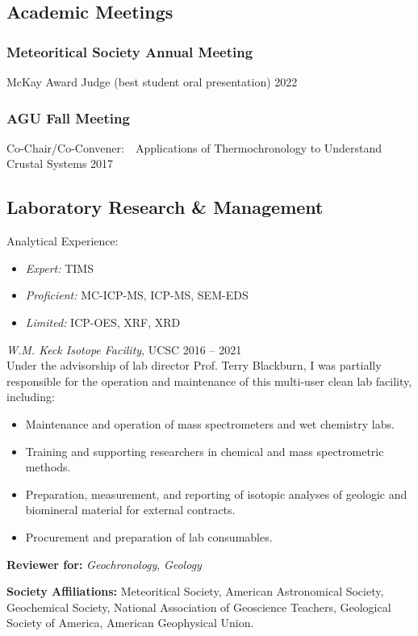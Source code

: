 \documentclass[10pt]{article}
\begin{document}
\subsection*{\textbf{Academic Meetings}}
\subsubsection*{Meteoritical Society Annual Meeting} 
	\par\quad McKay Award Judge (best student oral presentation) \hfill 2022

\subsubsection*{AGU Fall Meeting}
	\par\quad Co-Chair/Co-Convener:~~Applications of Thermochronology to Understand Crustal Systems \hfill 2017

\subsection*{\textbf{Laboratory Research \& Management}}
Analytical Experience:
	\begin{itemize} [label={}]
		\item \textit{Expert:} TIMS
		\item \textit{Proficient:} MC-ICP-MS, ICP-MS, SEM-EDS
		\item \textit{Limited:} ICP-OES, XRF, XRD
	\end{itemize} \vspace{1ex}	
 \textit{W.M. Keck Isotope Facility}, UCSC \hfill 2016 -- 2021\\
Under the advisorship of lab director Prof. Terry Blackburn, I was partially responsible for the operation and maintenance of this multi-user clean lab facility, including:
	\begin{itemize} 
	\item Maintenance and operation of mass spectrometers and wet chemistry labs.
	\item Training and supporting researchers in chemical and mass spectrometric methods.
	\item Preparation, measurement, and reporting of isotopic analyses of geologic and biomineral material for external contracts.
	\item Procurement and preparation of lab consumables.
	\end{itemize}

\vspace{2ex}
\begin{hangparas}{5ex}{1}
	\textbf{Reviewer for:} \textit{Geochronology}, \textit{Geology}

	\vspace{2ex}
	\textbf{Society Affiliations:} Meteoritical Society, American Astronomical Society, Geochemical Society, National Association of Geoscience Teachers, Geological Society of America, American Geophysical Union.
\end{hangparas}
\end{document}
